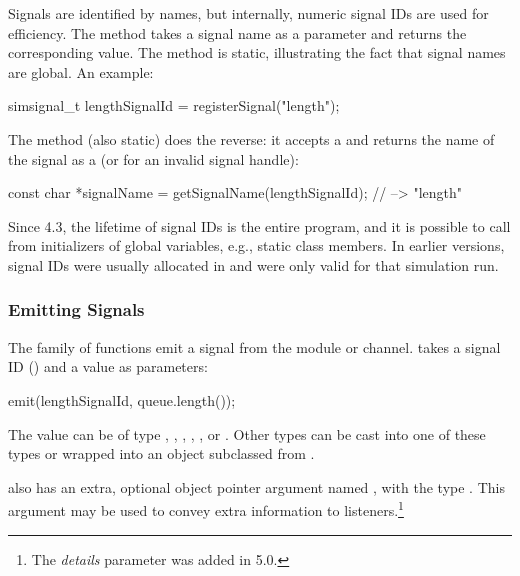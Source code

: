 Signals are identified by names, but internally, numeric signal IDs are used
for efficiency. The  method takes a signal name as
a parameter and returns the corresponding  value.
The method is static, illustrating the fact that signal names are global.
An example:

\begin{cpp}
simsignal_t lengthSignalId = registerSignal("length");
\end{cpp}

The  method (also static) does the reverse:
it accepts a  and returns the name of the signal as
a  (or  for an invalid signal handle):

\begin{cpp}
const char *signalName = getSignalName(lengthSignalId); // --> "length"
\end{cpp}

\begin{note}
  Since {\opp} 4.3, the lifetime of signal IDs is the entire program, and
  it is possible to call  from initializers of
  global variables, e.g., static class members. In earlier versions,
  signal IDs were usually allocated in  and were
  only valid for that simulation run.
\end{note}

\subsubsection{Emitting Signals}
\label{sec:simple-modules:emitting-signals}

The  family of functions emit a signal from the module or
channel.  takes a signal ID () and
a value as parameters:

\begin{cpp}
emit(lengthSignalId, queue.length());
\end{cpp}

The value can be of type , , , ,
, or . Other types can be cast into
one of these types or wrapped into an object subclassed from .

 also has an extra, optional object pointer argument named
, with the type . This argument may be used
to convey extra information to listeners.\footnote{The \textit{details}
parameter was added in {\opp} 5.0.}

